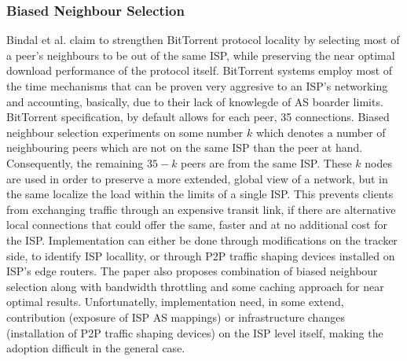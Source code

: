 \subsubsection{Biased Neighbour Selection}
Bindal et al. \cite{rpc_bitbiased_2006} claim to strengthen BitTorrent
protocol\cite{c_bittorrent_2003} locality by selecting most of a peer's
neighbours to be out of the same ISP, while preserving the near optimal download
performance of the protocol itself. BitTorrent systems employ most of the time
mechanisms that can be proven very aggresive to an ISP's networking and
accounting, basically, due to their lack of knowlegde of AS boarder limits.
BitTorrent specification, by default allows for each peer, 35 connections.
Biased neighbour selection experiments on some number $k$ which denotes a number
of neighbouring peers which are not on the same ISP than the peer at hand.
Consequently, the remaining $35 - k$ peers are from the same ISP. These $k$
nodes are used in order to preserve a more extended, global view of a network,
but in the same localize the load within the limits of a single ISP. This
prevents clients from exchanging traffic through an expensive transit link, if
there are alternative local connections that could offer the same, faster and at
no additional cost for the ISP. Implementation can either be done through
modifications on the tracker side, to identify ISP locallity, or through P2P
traffic shaping devices installed on ISP's edge routers. The paper also proposes
combination of biased neighbour selection along with bandwidth throttling and
some caching approach for near optimal results. Unfortunatelly, implementation
need, in some extend, contribution (exposure of ISP AS mappings) or
infrastructure changes (installation of P2P traffic shaping devices) on the ISP
level itself, making the adoption difficult in the general case.

